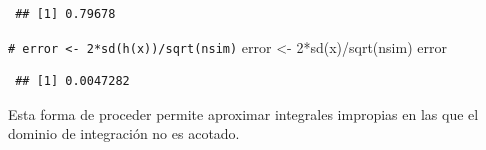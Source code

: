 \documentclass[
  10pt,
]{book}
\newenvironment{Shaded}{\begin{snugshade}}{\end{snugshade}}
\newcommand{\CommentTok}[1]{\textcolor[rgb]{0.56,0.35,0.01}{\textit{#1}}}
\newcommand{\DecValTok}[1]{\textcolor[rgb]{0.00,0.00,0.81}{#1}}
\newcommand{\FunctionTok}[1]{\textcolor[rgb]{0.00,0.00,0.00}{#1}}
\newcommand{\NormalTok}[1]{#1}
\newcommand{\OtherTok}[1]{\textcolor[rgb]{0.56,0.35,0.01}{#1}}
\newcommand{\SpecialCharTok}[1]{\textcolor[rgb]{0.00,0.00,0.00}{#1}}
\theoremstyle{break}
\theoremstyle{nonumberplain}
\renewcommand{\CommentTok}[1]{\textcolor[rgb]{0.41,0.41,0.41}{\texttt{#1}}}
\begin{document}
\begin{verbatim}
 ## [1] 0.79678
\end{verbatim}

\begin{Shaded}
\begin{Highlighting}[]
\CommentTok{\# error \textless{}{-} 2*sd(h(x))/sqrt(nsim)}
\NormalTok{error }\OtherTok{\textless{}{-}} \DecValTok{2}\SpecialCharTok{*}\FunctionTok{sd}\NormalTok{(x)}\SpecialCharTok{/}\FunctionTok{sqrt}\NormalTok{(nsim)}
\NormalTok{error}
\end{Highlighting}
\end{Shaded}

\begin{verbatim}
 ## [1] 0.0047282
\end{verbatim}

Esta forma de proceder permite aproximar integrales impropias en las que el dominio de integración no es acotado.
\end{document}
